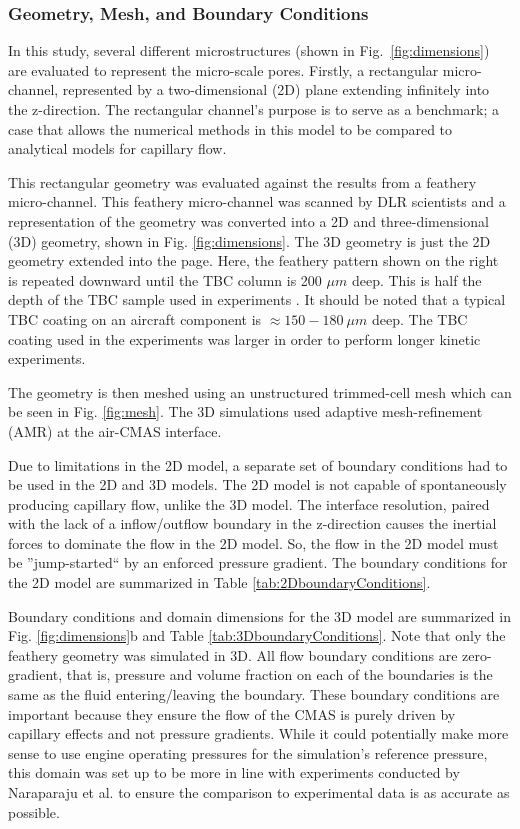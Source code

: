 \documentclass{UCF_ETD}
\begin{document}
\subsubsection{Geometry, Mesh, and Boundary Conditions}

In this study, several different microstructures (shown in Fig.~\ref{fig:dimensions}) are evaluated to represent the micro-scale pores. Firstly, a rectangular micro-channel, represented by a two-dimensional (2D) plane extending infinitely into the z-direction. The rectangular channel's purpose is to serve as a benchmark; a case that allows the numerical methods in this model to be compared to analytical models for capillary flow. 

This rectangular geometry was  evaluated against the results from a feathery micro-channel. This feathery micro-channel was scanned by DLR scientists \cite{Sirigiri2018} and a representation of the geometry was converted into a 2D and three-dimensional (3D) geometry, shown in Fig. \ref{fig:dimensions}. The 3D geometry is just the 2D geometry extended into the page. Here, the feathery pattern shown on the right is repeated downward until the TBC column is 200 $\mu m$ deep. This is half the depth of the TBC sample used in experiments \cite{Naraparaju2019}. It should be noted that a typical TBC coating on an aircraft component is $\approx 150 - 180~\mu m$ deep. The TBC coating used in the experiments was larger in order to perform longer kinetic experiments. 

The geometry is then meshed using an unstructured trimmed-cell mesh which can be seen in Fig. \ref{fig:mesh}. The 3D simulations used adaptive mesh-refinement (AMR) at the air-CMAS interface. 

Due to limitations in the 2D model, a separate set of boundary conditions had to be used in the 2D and 3D models. The 2D model is not capable of spontaneously producing capillary flow, unlike the 3D model. The interface resolution, paired with the lack of a inflow/outflow boundary in the z-direction causes the inertial forces to dominate the flow in the 2D model. So, the flow in the 2D model must be ''jump-started`` by an enforced pressure gradient. The boundary conditions for the 2D model are summarized in Table \ref{tab:2DboundaryConditions}. 

Boundary conditions and domain dimensions for the 3D model are summarized in Fig. \ref{fig:dimensions}b and Table \ref{tab:3DboundaryConditions}. Note that only the feathery geometry was simulated in 3D. All flow boundary conditions are zero-gradient, that is, pressure and volume fraction on each of the boundaries is the same as the fluid entering/leaving the boundary. These boundary conditions are important because they ensure the flow of the CMAS is purely driven by capillary effects and not pressure gradients. While it could potentially make more sense to use engine operating pressures for the simulation's reference pressure, this domain was set up to be more in line with experiments conducted by Naraparaju et al. \cite{Naraparaju2014, Naraparaju2017, Naraparaju2019} to ensure the comparison to experimental data is as accurate as possible.
\end{document}
